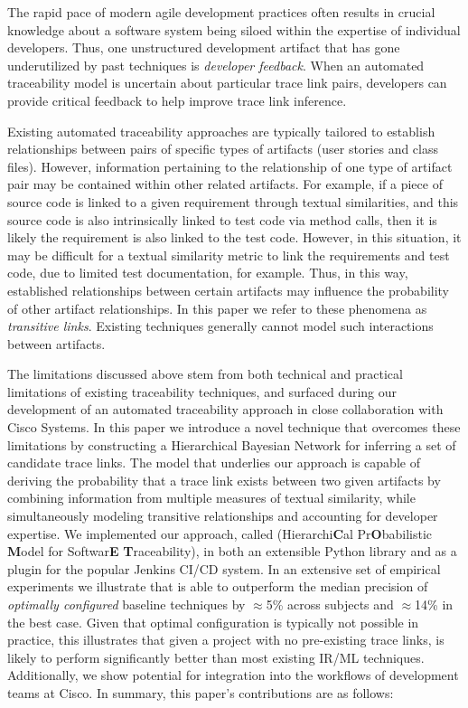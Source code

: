  The rapid pace of modern agile development practices often results in crucial knowledge about a software system being siloed within the expertise of individual developers. Thus, one unstructured development artifact that has gone underutilized by past techniques is \textit{developer feedback}. When an automated traceability model is uncertain about particular trace link pairs, developers can provide critical feedback to help improve trace link inference.

Existing automated traceability approaches are typically tailored to establish relationships between pairs of specific types of artifacts (\eg user stories and class files). However, information pertaining to the relationship of one type of artifact pair may be contained within other related artifacts. For example, if a piece of source code is linked to a given requirement through textual similarities, and this source code is also intrinsically linked to test code via method calls, then it is likely the requirement is also linked to the test code. However, in this situation, it may be difficult for a textual similarity metric to link the requirements and test code, due to limited test documentation, for example. Thus, in this way, established relationships between certain artifacts may influence the probability of other artifact relationships. In this paper we refer to these phenomena as \textit{transitive links}. Existing techniques generally cannot model such interactions between artifacts.

The limitations discussed above stem from both technical and practical limitations of existing traceability techniques, and surfaced during our development of an automated traceability approach in close collaboration with Cisco Systems. In this paper we introduce a novel technique that overcomes these limitations by constructing a Hierarchical Bayesian Network for inferring a set of candidate trace links. The model that underlies our approach is capable of deriving the probability that a trace link exists between two given artifacts by combining information from multiple measures of textual similarity, while simultaneously modeling transitive relationships and accounting for developer expertise.  We implemented our approach, called \Comet (Hierarchi\textbf{C}al Pr\textbf{O}babilistic \textbf{M}odel for Softwar\textbf{E} \textbf{T}raceability), in both an extensible Python library and as a plugin for the popular Jenkins CI/CD system.  In an extensive set of empirical experiments we illustrate that \Comet is able to outperform the median precision of \textit{optimally configured} baseline techniques by $\approx$5\% across subjects and $\approx$14\% in the best case. Given that optimal configuration is typically not possible in practice, this illustrates that given a project with no pre-existing trace links, \Comet is likely to perform significantly better than most existing IR/ML techniques. Additionally, we show \Comets potential for integration into the workflows of development teams at Cisco. In summary, this paper's contributions are as follows:

